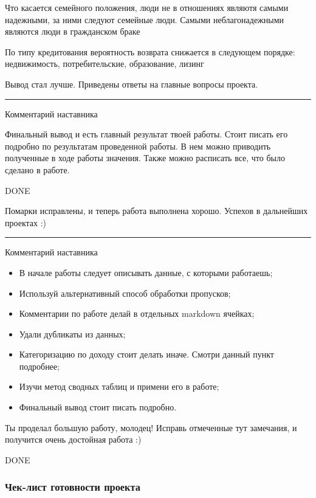 \documentclass[11pt]{article}
\providecommand{\tightlist}{%
      \setlength{\itemsep}{0pt}\setlength{\parskip}{0pt}}
\begin{document}
Что касается семейного положения, люди не в отношениях являютя самыми
надежными, за ними следуют семейные люди. Самыми неблагонадежными
являются люди в гражданском браке

По типу кредитования вероятность возврата снижается в следующем порядке:
недвижимость, потребительские, образование, лизинг

    Вывод стал лучше. Приведены ответы на главные вопросы проекта.

\begin{center}\rule{0.5\linewidth}{0.5pt}\end{center}

    Комментарий наставника

Финальный вывод и есть главный результат твоей работы. Стоит писать его
подробно по результатам проведенной работы. В нем можно приводить
полученные в ходе работы значения. Также можно расписать все, что было
сделано в работе.

    DONE

    Помарки исправлены, и теперь работа выполнена хорошо. Успехов в
дальнейших проектах :)

\begin{center}\rule{0.5\linewidth}{0.5pt}\end{center}

    Комментарий наставника

\begin{itemize}
\tightlist
\item
  В начале работы следует описывать данные, с которыми работаешь;
\item
  Используй альтернативный способ обработки пропусков;
\item
  Комментарии по работе делай в отдельных markdown ячейках;
\item
  Удали дубликаты из данных;
\item
  Категоризацию по доходу стоит делать иначе. Смотри данный пункт
  подробнее;
\item
  Изучи метод сводных таблиц и примени его в работе;
\item
  Финальный вывод стоит писать подробно.
\end{itemize}

Ты проделал большую работу, молодец! Исправь отмеченные тут замечания, и
получится очень достойная работа :)

    DONE

    \hypertarget{ux447ux435ux43a-ux43bux438ux441ux442-ux433ux43eux442ux43eux432ux43dux43eux441ux442ux438-ux43fux440ux43eux435ux43aux442ux430}{%
\subsubsection{Чек-лист готовности
проекта}\label{ux447ux435ux43a-ux43bux438ux441ux442-ux433ux43eux442ux43eux432ux43dux43eux441ux442ux438-ux43fux440ux43eux435ux43aux442ux430}}
\end{document}
